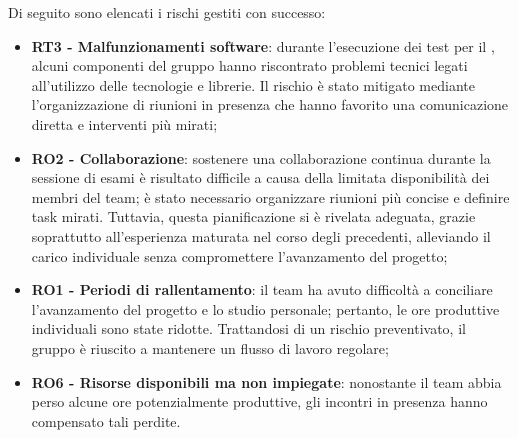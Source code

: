 \vspace{0.5\baselineskip}
\par Di seguito sono elencati i rischi gestiti con successo:
\begin{itemize}
  \item \textbf{RT3 - Malfunzionamenti software}: durante l'esecuzione dei test per il , alcuni componenti del gruppo hanno riscontrato problemi tecnici legati all'utilizzo delle tecnologie e librerie. Il rischio è stato mitigato mediante l'organizzazione di riunioni in presenza che hanno favorito una comunicazione diretta e interventi più mirati;
  \item \textbf{RO2 - Collaborazione}: sostenere una collaborazione continua durante la sessione di esami è risultato difficile a causa della limitata disponibilità dei membri del team; è stato necessario organizzare riunioni più concise e definire task mirati. Tuttavia, questa pianificazione si è rivelata adeguata, grazie soprattutto all'esperienza maturata nel corso degli  precedenti, alleviando il carico individuale senza compromettere l'avanzamento del progetto;
  \item \textbf{RO1 - Periodi di rallentamento}: il team ha avuto difficoltà a conciliare l'avanzamento del progetto e lo studio personale; pertanto, le ore produttive individuali sono state ridotte. Trattandosi di un rischio preventivato, il gruppo è riuscito a mantenere un flusso di lavoro regolare;
  \item \textbf{RO6 - Risorse disponibili ma non impiegate}: nonostante il team abbia perso alcune ore potenzialmente produttive, gli incontri in presenza hanno compensato tali perdite.
\end{itemize}

